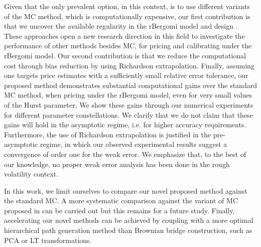 
Given that the only prevalent option, in this context, is to use different variants of the MC method, which is computationally expensive, our first contribution  is that we uncover the available regularity in the rBergomi model and  design . These approaches  open a new research direction in this field to investigate the performance of other methods besides MC, for pricing and calibrating under the rBergomi model. Our second contribution is that we reduce the computational cost  through bias reduction by using Richardson extrapolation. Finally, assuming one targets price estimates with a sufficiently small relative error tolerance, our proposed method demonstrates substantial computational gains  over the standard MC method, when pricing under the rBergomi model, even for very small values of the Hurst parameter. We show  these gains through our numerical experiments for  different parameter constellations.  We clarify that we do not claim that these gains will hold in the asymptotic regime, i.e.  for higher accuracy requirements. Furthermore, the use of Richardson extrapolation is justified in the pre-asymptotic regime, in which our observed experimental results suggest a convergence of order one for the weak error. We emphasize that, to the best of our knowledge, no proper weak error analysis has been done in the rough volatility context. 

In this work, we limit ourselves to compare our novel proposed method against the standard MC. A more systematic comparison against the variant of MC proposed in \cite{mccrickerd2018turbocharging}  can be carried out but this remains for a future study. Finally, accelerating  our novel  methods can be achieved  by coupling  with a more optimal hierarchical path generation method than Brownian bridge construction, such as PCA or LT transformations.